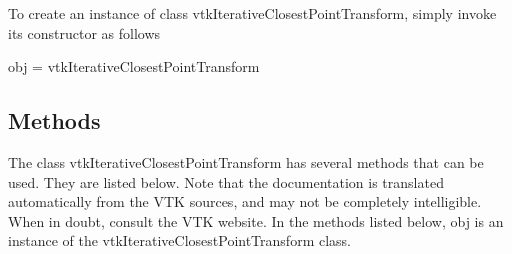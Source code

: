 To create an instance of class vtk\-Iterative\-Closest\-Point\-Transform, simply invoke its constructor as follows \begin{DoxyVerb}  obj = vtkIterativeClosestPointTransform
\end{DoxyVerb}
 \hypertarget{vtkwidgets_vtkxyplotwidget_Methods}{}\subsection{Methods}\label{vtkwidgets_vtkxyplotwidget_Methods}
The class vtk\-Iterative\-Closest\-Point\-Transform has several methods that can be used. They are listed below. Note that the documentation is translated automatically from the V\-T\-K sources, and may not be completely intelligible. When in doubt, consult the V\-T\-K website. In the methods listed below, {\ttfamily obj} is an instance of the vtk\-Iterative\-Closest\-Point\-Transform class. 
